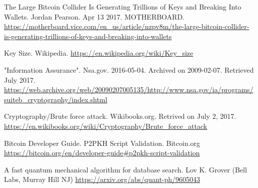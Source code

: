 \documentclass[11pt]{article}
\begin{document}
\begin{thebibliography}{7}
The Large Bitcoin Collider Is Generating Trillions of Keys and Breaking Into Wallets. Jordan Pearson. Apr 13 2017. MOTHERBOARD.
\url{https://motherboard.vice.com/en_us/article/nzpv8m/the-large-bitcoin-collider-is-generating-trillions-of-keys-and-breaking-into-wallets}

Key Size. Wikipedia.
\url{https://en.wikipedia.org/wiki/Key_size}

"Information Assurance". Nsa.gov. 2016-05-04. Archived on 2009-02-07. Retrieved July 2017.
\url{https://web.archive.org/web/20090207005135/http://www.nsa.gov/ia/programs/suiteb_cryptography/index.shtml}

Cryptography/Brute force attack. Wikibooks.org. Retrived on July 2, 2017.
\url{https://en.wikibooks.org/wiki/Cryptography/Brute_force_attack}

Bitcoin Developer Guide. P2PKH Script Validation. Bitcoin.org
\url{https://bitcoin.org/en/developer-guide#p2pkh-script-validation}

A fast quantum mechanical algorithm for database search. Lov K. Grover (Bell Labs, Murray Hill NJ)
\url{https://arxiv.org/abs/quant-ph/9605043}

\end{thebibliography}
\end{document}
